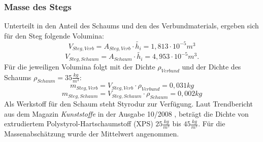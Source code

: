 \subsubsection{Masse des Stegs}
Unterteilt in den Anteil des Schaums und den des Verbundmaterials, ergeben sich für den Steg folgende Volumina:
\begin{equation}
	V_{Steg,Verb}=A_{Steg,Verb}\cdot\tilde{h_{i}}=1,813\cdot10^{-5}m^{3}
\end{equation}
\begin{equation}
	V_{Steg,Schaum}=A_{Schaum}\cdot\tilde{h_{i}}=4,953\cdot10^{-5}m^{3}.
\end{equation}
Für die jeweiligen Volumina folgt mit der Dichte $ \rho_{Verbund} $ und der Dichte des Schaums $ \rho_{Schaum}=35\frac{kg}{m^{3}} $:
\begin{equation}
	m_{Steg,Verb}=V_{Steg,Verb}\cdot\rho_{Verbund}=0,031kg
\end{equation}
\begin{equation}
		m_{Steg,Schaum}=V_{Steg,Schaum}\cdot\rho_{Schaum}=0,002kg
\end{equation}
Als Werkstoff für den Schaum steht Styrodur zur Verfügung. Laut Trendbericht aus dem Magazin \textit{Kunststoffe} in der Ausgabe 10/2008 \cite{item7}, beträgt die Dichte von extrudiertem Polystyrol-Hartschaumstoff (XPS) $ 25\frac{kg}{m^{3}} $ bis $ 45\frac{kg}{m^{3}} $. Für die Massenabschätzung wurde der Mittelwert angenommen.

